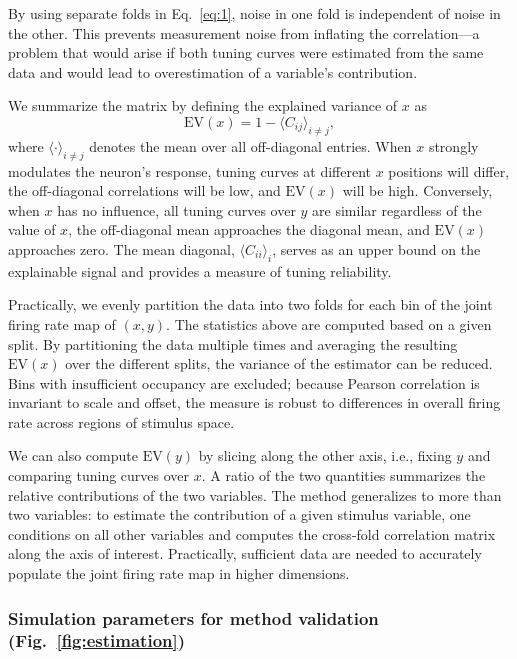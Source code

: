 \documentclass[11pt]{article}
\begin{document}
By using separate folds in Eq.~\ref{eq:1}, noise in one fold is independent of noise in the other. This prevents measurement noise from inflating the correlation---a problem that would arise if both tuning curves were estimated from the same data and would lead to overestimation of a variable's contribution.

We summarize the matrix by defining the explained variance of $x$ as
\begin{equation}
\mathrm{EV}(x) = 1 - \langle C_{ij} \rangle_{i \neq j},
\label{eq:2}
\end{equation}
where $\langle \cdot \rangle_{i \neq j}$ denotes the mean over all off-diagonal entries. When $x$ strongly modulates the neuron's response, tuning curves at different $x$ positions will differ, the off-diagonal correlations will be low, and $\mathrm{EV}(x)$ will be high. Conversely, when $x$ has no influence, all tuning curves over $y$ are similar regardless of the value of $x$, the off-diagonal mean approaches the diagonal mean, and $\mathrm{EV}(x)$ approaches zero. The mean diagonal, $\langle C_{ii} \rangle_i$, serves as an upper bound on the explainable signal and provides a measure of tuning reliability.

Practically, we evenly partition the data into two folds for each bin of the joint firing rate map of $(x, y)$. The statistics above are computed based on a given split. By partitioning the data multiple times and averaging the resulting $\mathrm{EV}(x)$ over the different splits, the variance of the estimator can be reduced. Bins with insufficient occupancy are excluded; because Pearson correlation is invariant to scale and offset, the measure is robust to differences in overall firing rate across regions of stimulus space.

We can also compute $\mathrm{EV}(y)$ by slicing along the other axis, i.e., fixing $y$ and comparing tuning curves over $x$. A ratio of the two quantities summarizes the relative contributions of the two variables. The method generalizes to more than two variables: to estimate the contribution of a given stimulus variable, one conditions on all other variables and computes the cross-fold correlation matrix along the axis of interest. Practically, sufficient data are needed to accurately populate the joint firing rate map in higher dimensions.

\subsubsection*{Simulation parameters for method validation (Fig.~\ref{fig:estimation})}
\end{document}
